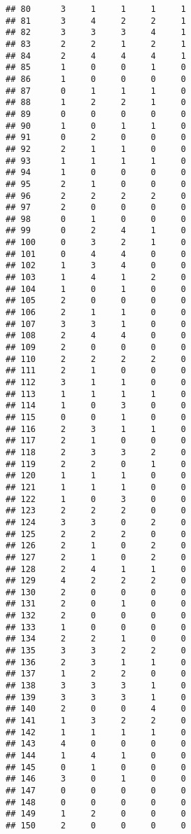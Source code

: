 \documentclass[
]{article}
\begin{document}
\begin{verbatim}
## 80      3     1     1     1     1
## 81      3     4     2     2     1
## 82      3     3     3     4     1
## 83      2     2     1     2     1
## 84      2     4     4     4     1
## 85      1     0     0     1     0
## 86      1     0     0     0     0
## 87      0     1     1     1     0
## 88      1     2     2     1     0
## 89      0     0     0     0     0
## 90      1     0     1     1     0
## 91      0     2     0     0     0
## 92      2     1     1     0     0
## 93      1     1     1     1     0
## 94      1     0     0     0     0
## 95      2     1     0     0     0
## 96      2     2     2     2     0
## 97      2     0     0     0     0
## 98      0     1     0     0     0
## 99      0     2     4     1     0
## 100     0     3     2     1     0
## 101     0     4     4     0     0
## 102     1     3     4     0     0
## 103     1     4     1     2     0
## 104     1     0     1     0     0
## 105     2     0     0     0     0
## 106     2     1     1     0     0
## 107     3     3     1     0     0
## 108     2     4     4     0     0
## 109     2     0     0     0     0
## 110     2     2     2     2     0
## 111     2     1     0     0     0
## 112     3     1     1     0     0
## 113     1     1     1     1     0
## 114     1     0     3     0     0
## 115     0     0     1     0     0
## 116     2     3     1     1     0
## 117     2     1     0     0     0
## 118     2     3     3     2     0
## 119     2     2     0     1     0
## 120     1     1     1     0     0
## 121     1     1     1     0     0
## 122     1     0     3     0     0
## 123     2     2     2     0     0
## 124     3     3     0     2     0
## 125     2     2     2     0     0
## 126     2     1     0     2     0
## 127     2     1     0     2     0
## 128     2     4     1     1     0
## 129     4     2     2     2     0
## 130     2     0     0     0     0
## 131     2     0     1     0     0
## 132     2     0     0     0     0
## 133     1     0     0     0     0
## 134     2     2     1     0     0
## 135     3     3     2     2     0
## 136     2     3     1     1     0
## 137     1     2     2     0     0
## 138     3     3     3     1     0
## 139     3     3     3     1     0
## 140     2     0     0     4     0
## 141     1     3     2     2     0
## 142     1     1     1     1     0
## 143     4     0     0     0     0
## 144     1     4     1     0     0
## 145     0     1     0     0     0
## 146     3     0     1     0     0
## 147     0     0     0     0     0
## 148     0     0     0     0     0
## 149     1     2     0     0     0
## 150     2     0     0     0     0

\end{verbatim}
\end{document}
